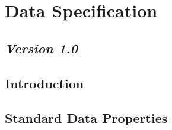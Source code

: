 \section{Data Specification}
\subsection*{\textit{Version 1.0}}
\subsection{Introduction}
\subsection{Standard Data Properties}
\orgcishellframeworkdata{}
